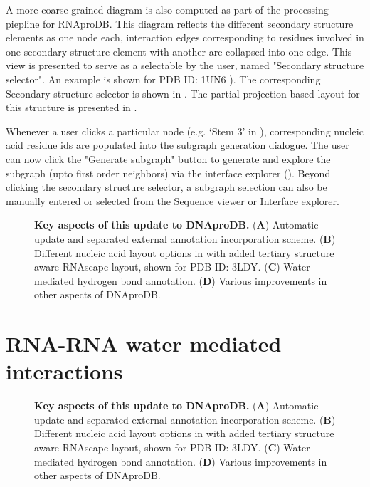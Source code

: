 A more coarse grained diagram is also computed as part of the processing piepline for RNAproDB. This diagram reflects the different secondary structure elements as one node each, interaction edges corresponding to residues involved in one secondary structure element with another are collapsed into one edge. This view is presented to serve as a selectable by the user, named "Secondary structure selector". An example is shown for PDB ID: 1UN6 ). The corresponding Secondary structure selector is shown in . The partial projection-based layout for this structure is presented in . 

Whenever a user clicks a particular node (e.g. `Stem 3' in ), corresponding nucleic acid residue ids are populated into the subgraph generation dialogue. The user can now click the "Generate subgraph" button to generate and explore the subgraph (upto first order neighbors) via the interface explorer (). Beyond clicking the secondary structure selector, a subgraph selection can also be manually entered or selected from the Sequence viewer or Interface explorer. 

\begin{center}
    \begin{figure}
        \caption[Key aspects of this update to DNAproDB.]{\textbf{Key aspects of this update to DNAproDB.} ({\bf A}) Automatic update and separated external annotation incorporation scheme.  ({\bf B})  Different nucleic acid layout options in with added tertiary structure aware RNAscape layout, shown for PDB ID: 3LDY. ({\bf C}) Water-mediated hydrogen bond annotation. ({\bf D}) Various improvements in other aspects of DNAproDB. }
  \label{fig:rnaprodb2}
\end{figure}
\end{center}

\section{RNA-RNA water mediated interactions}


\begin{center}
    \begin{figure}
        \caption[Key aspects of this update to DNAproDB.]{\textbf{Key aspects of this update to DNAproDB.} ({\bf A}) Automatic update and separated external annotation incorporation scheme.  ({\bf B})  Different nucleic acid layout options in with added tertiary structure aware RNAscape layout, shown for PDB ID: 3LDY. ({\bf C}) Water-mediated hydrogen bond annotation. ({\bf D}) Various improvements in other aspects of DNAproDB. }
  \label{fig:rnaprodb3}
\end{figure}
\end{center}
